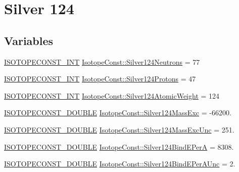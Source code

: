 \hypertarget{group___isotope_const-_silver-_ag124}{}\section{Silver 124}
\label{group___isotope_const-_silver-_ag124}
\subsection*{Variables}
\begin{DoxyCompactItemize}
\item 
\mbox{\hyperlink{group___isotope_const-_macros_ga5f18360b3e99483a35c32d789e62621c}{I\+S\+O\+T\+O\+P\+E\+C\+O\+N\+S\+T\+\_\+\+I\+NT}} \mbox{\hyperlink{group___isotope_const-_silver-_ag124_gad628d1f869a400cdebd04bb13a5e9975}{Isotope\+Const\+::\+Silver124\+Neutrons}} = 77
\item 
\mbox{\hyperlink{group___isotope_const-_macros_ga5f18360b3e99483a35c32d789e62621c}{I\+S\+O\+T\+O\+P\+E\+C\+O\+N\+S\+T\+\_\+\+I\+NT}} \mbox{\hyperlink{group___isotope_const-_silver-_ag124_gafad60038050f11890351ad79ebe20351}{Isotope\+Const\+::\+Silver124\+Protons}} = 47
\item 
\mbox{\hyperlink{group___isotope_const-_macros_ga5f18360b3e99483a35c32d789e62621c}{I\+S\+O\+T\+O\+P\+E\+C\+O\+N\+S\+T\+\_\+\+I\+NT}} \mbox{\hyperlink{group___isotope_const-_silver-_ag124_ga241c74cff0bcfbf2928f5553a7f55ea0}{Isotope\+Const\+::\+Silver124\+Atomic\+Weight}} = 124
\item 
\mbox{\hyperlink{group___isotope_const-_macros_ga8f45a7272ce02c0b4c65c44636ed719a}{I\+S\+O\+T\+O\+P\+E\+C\+O\+N\+S\+T\+\_\+\+D\+O\+U\+B\+LE}} \mbox{\hyperlink{group___isotope_const-_silver-_ag124_ga24d971a15c5fca92cd052569fea8df6f}{Isotope\+Const\+::\+Silver124\+Mass\+Exc}} = -\/66200.
\item 
\mbox{\hyperlink{group___isotope_const-_macros_ga8f45a7272ce02c0b4c65c44636ed719a}{I\+S\+O\+T\+O\+P\+E\+C\+O\+N\+S\+T\+\_\+\+D\+O\+U\+B\+LE}} \mbox{\hyperlink{group___isotope_const-_silver-_ag124_gab128dbf3ce246dc351a28de60f807e80}{Isotope\+Const\+::\+Silver124\+Mass\+Exc\+Unc}} = 251.
\item 
\mbox{\hyperlink{group___isotope_const-_macros_ga8f45a7272ce02c0b4c65c44636ed719a}{I\+S\+O\+T\+O\+P\+E\+C\+O\+N\+S\+T\+\_\+\+D\+O\+U\+B\+LE}} \mbox{\hyperlink{group___isotope_const-_silver-_ag124_ga771a56ddeb99f3c1b6146e8219cf5fee}{Isotope\+Const\+::\+Silver124\+Bind\+E\+PerA}} = 8308.
\item 
\mbox{\hyperlink{group___isotope_const-_macros_ga8f45a7272ce02c0b4c65c44636ed719a}{I\+S\+O\+T\+O\+P\+E\+C\+O\+N\+S\+T\+\_\+\+D\+O\+U\+B\+LE}} \mbox{\hyperlink{group___isotope_const-_silver-_ag124_gac21c4bb617c9de8d09e1ccfad01a969b}{Isotope\+Const\+::\+Silver124\+Bind\+E\+Per\+A\+Unc}} = 2.

\end{DoxyCompactItemize}
